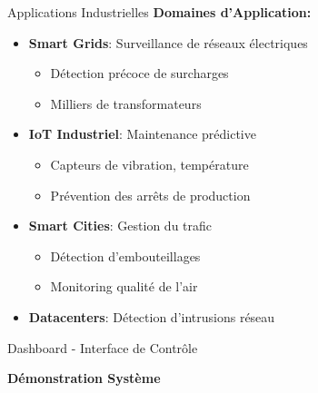 \documentclass[aspectratio=169]{beamer}
\begin{document}
\begin{frame}{Applications Industrielles}
    \textbf{Domaines d'Application:}
    
    \vspace{0.3cm}
    
    \begin{itemize}
        \item \textbf{Smart Grids}: Surveillance de réseaux électriques
        \begin{itemize}
            \item Détection précoce de surcharges
            \item Milliers de transformateurs
        \end{itemize}
        
        \vspace{0.2cm}
        
        \item \textbf{IoT Industriel}: Maintenance prédictive
        \begin{itemize}
            \item Capteurs de vibration, température
            \item Prévention des arrêts de production
        \end{itemize}
        
        \vspace{0.2cm}
        
        \item \textbf{Smart Cities}: Gestion du trafic
        \begin{itemize}
            \item Détection d'embouteillages
            \item Monitoring qualité de l'air
        \end{itemize}
        
        \vspace{0.2cm}
        
        \item \textbf{Datacenters}: Détection d'intrusions réseau
    \end{itemize}
\end{frame}


\begin{frame}{Dashboard - Interface de Contrôle}
    \begin{center}
        {\LARGE\textbf{Démonstration Système}}
    \end{center}
    
    \vspace{0.5cm}
    

    
    
\end{frame}
\end{document}
